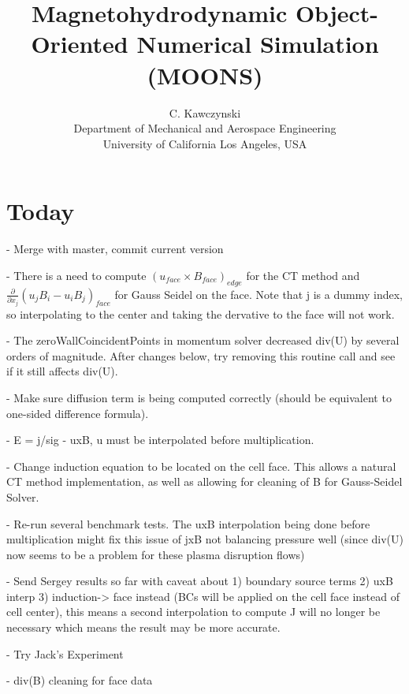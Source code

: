 \documentclass[11pt]{article}
\begin{document}
\doublespacing
\title{Magnetohydrodynamic Object-Oriented Numerical Simulation (MOONS)}
\author{C. Kawczynski \\
Department of Mechanical and Aerospace Engineering \\
University of California Los Angeles, USA\\
}
\maketitle

\section{Today}

- Merge with master, commit current version

- There is a need to compute $(u_{face}\times B_{face})_{edge}$ for the CT method and
$\frac{\partial}{\partial x_j} (u_j B_i-u_iB_j)_{face}$ for Gauss Seidel on the face. Note that j is a dummy index, so interpolating to the center and taking the dervative to the face will not work.

- The zeroWallCoincidentPoints in momentum solver decreased div(U) by several orders of magnitude. After changes below, try removing this routine call and see if it still affects div(U).

- Make sure diffusion term is being computed correctly (should be equivalent to one-sided difference formula). 

- E = j/sig - uxB, u must be interpolated before multiplication.

- Change induction equation to be located on the cell face. This allows a natural CT method implementation, as well as allowing for cleaning of B for Gauss-Seidel Solver.

- Re-run several benchmark tests. The uxB interpolation being done before multiplication might fix this issue of jxB not balancing pressure well (since div(U) now seems to be a problem for these plasma disruption flows)

- Send Sergey results so far with caveat about 1) boundary source terms 2) uxB interp 3) induction-> face instead (BCs will be applied on the cell face instead of cell center), this means a second interpolation to compute J will no longer be necessary which means the result may be more accurate.

- Try Jack's Experiment

- div(B) cleaning for face data
\end{document}
